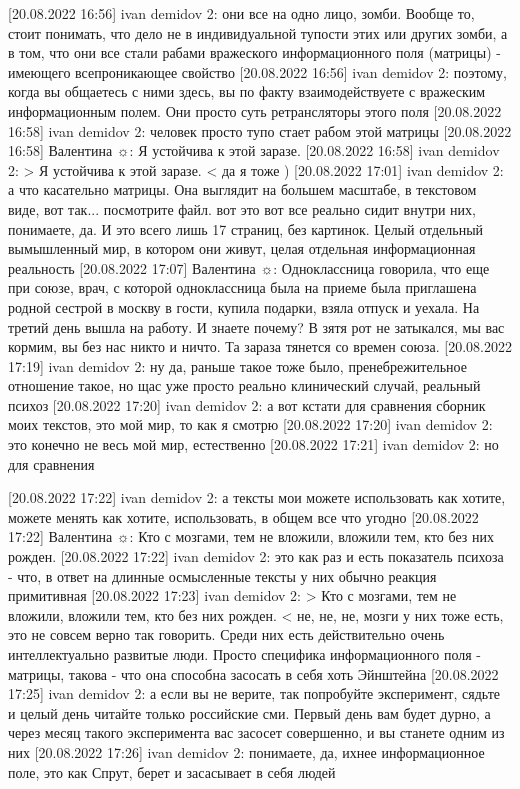  
 
 
 
 

[20.08.2022 16:56] ivan demidov 2: они все на одно лицо, зомби. Вообще то, стоит понимать, что дело не в индивидуальной тупости этих или других зомби, а в том, что они все стали рабами вражеского информационного поля (матрицы) - имеющего всепроникающее свойство
[20.08.2022 16:56] ivan demidov 2: поэтому, когда вы общаетесь с ними здесь, вы по факту взаимодействуете с вражеским информационным полем. Они просто суть ретрансляторы этого поля
[20.08.2022 16:58] ivan demidov 2: человек просто тупо стает рабом этой матрицы
[20.08.2022 16:58] Валентина ☼: Я устойчива к этой заразе.
[20.08.2022 16:58] ivan demidov 2: 
> Я устойчива к этой заразе. <
да я тоже )
[20.08.2022 17:01] ivan demidov 2: а что касательно матрицы. Она выглядит на большем масштабе, в текстовом виде, вот так... посмотрите файл. вот это вот все реально сидит внутри них, понимаете, да. И это всего лишь 17 страниц, без картинок. Целый отдельный вымышленный мир, в котором они живут, целая отдельная информационная реальность
[20.08.2022 17:07] Валентина ☼: Одноклассница говорила, что еще при союзе, врач, с которой одноклассница была на приеме была приглашена родной сестрой в москву в гости, купила подарки, взяла отпуск и уехала. На третий день вышла на работу.   И знаете почему? В зятя рот не затыкался, мы вас кормим, вы без нас никто и ничто. Та зараза тянется со времен союза.
[20.08.2022 17:19] ivan demidov 2: ну да, раньше такое тоже было, пренебрежительное отношение такое, но щас уже просто реально клинический случай, реальный психоз
[20.08.2022 17:20] ivan demidov 2: а вот кстати для сравнения сборник моих текстов, это мой мир, то как я смотрю
[20.08.2022 17:20] ivan demidov 2: это конечно не весь мой мир, естественно
[20.08.2022 17:21] ivan demidov 2: но для сравнения

[20.08.2022 17:22] ivan demidov 2: а тексты мои можете использовать как хотите, можете менять как хотите, использовать, в общем все что угодно
[20.08.2022 17:22] Валентина ☼: Кто с мозгами, тем не вложили, вложили тем, кто без них рожден.
[20.08.2022 17:22] ivan demidov 2: это как раз и есть показатель психоза - что, в ответ на длинные осмысленные тексты у них обычно реакция примитивная
[20.08.2022 17:23] ivan demidov 2: 
> Кто с мозгами, тем не вложили, вложили тем, кто без них рожден. <
не, не, не, мозги у них тоже есть, это не совсем верно так говорить. Среди них есть действительно очень интеллектуально развитые люди. Просто специфика информационного поля - матрицы, такова - что она способна засосать в себя хоть Эйнштейна
[20.08.2022 17:25] ivan demidov 2: а если вы не верите, так попробуйте эксперимент, сядьте и целый день читайте только российские сми. Первый день вам будет дурно, а через месяц такого эксперимента вас засосет совершенно, и вы станете одним из них
[20.08.2022 17:26] ivan demidov 2: понимаете, да, ихнее информационное поле, это как Спрут, берет и засасывает в себя людей

